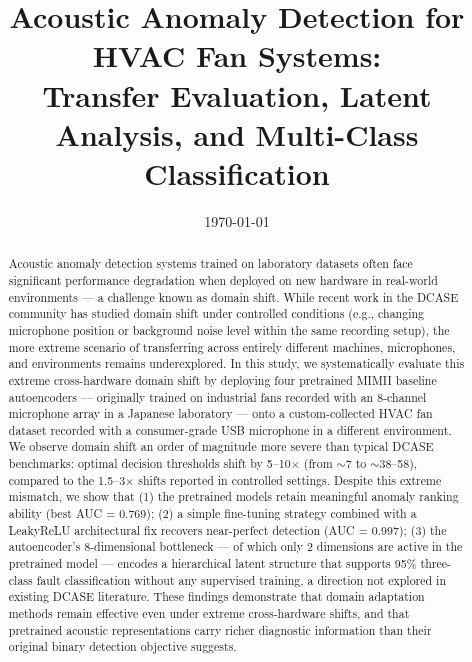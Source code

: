 \documentclass[12pt, a4paper]{article}
\title{
    Acoustic Anomaly Detection for HVAC Fan Systems:\\
    Transfer Evaluation, Latent Analysis, and Multi-Class Classification
}
\author{
}
\date{\today}
\begin{document}
\maketitle

\begin{abstract}
Acoustic anomaly detection systems trained on laboratory datasets often face significant performance degradation when deployed on new hardware in real-world environments --- a challenge known as domain shift. While recent work in the DCASE community has studied domain shift under controlled conditions (e.g., changing microphone position or background noise level within the same recording setup), the more extreme scenario of transferring across entirely different machines, microphones, and environments remains underexplored. In this study, we systematically evaluate this extreme cross-hardware domain shift by deploying four pretrained MIMII baseline autoencoders --- originally trained on industrial fans recorded with an 8-channel microphone array in a Japanese laboratory --- onto a custom-collected HVAC fan dataset recorded with a consumer-grade USB microphone in a different environment. We observe domain shift an order of magnitude more severe than typical DCASE benchmarks: optimal decision thresholds shift by 5--10$\times$ (from $\sim$7 to $\sim$38--58), compared to the 1.5--3$\times$ shifts reported in controlled settings. Despite this extreme mismatch, we show that (1) the pretrained models retain meaningful anomaly ranking ability (best AUC = 0.769); (2) a simple fine-tuning strategy combined with a LeakyReLU architectural fix recovers near-perfect detection (AUC = 0.997); (3) the autoencoder's 8-dimensional bottleneck --- of which only 2 dimensions are active in the pretrained model --- encodes a hierarchical latent structure that supports 95\% three-class fault classification without any supervised training, a direction not explored in existing DCASE literature. These findings demonstrate that domain adaptation methods remain effective even under extreme cross-hardware shifts, and that pretrained acoustic representations carry richer diagnostic information than their original binary detection objective suggests.
\end{abstract}

\tableofcontents
\newpage


\end{document}
